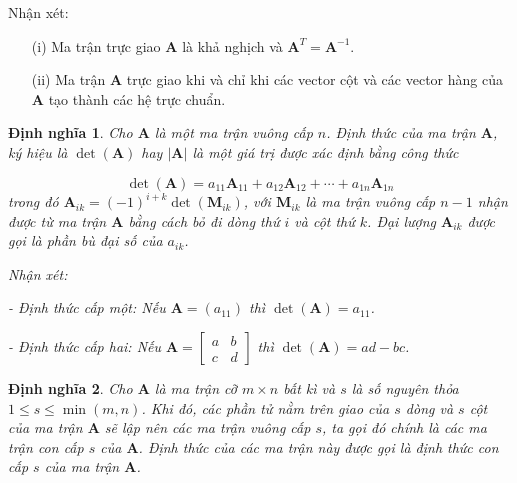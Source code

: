 \documentclass[12pt,a4paper,oneside]{report}
\newtheorem{dn}{Định nghĩa}[section]
\numberwithin{equation}{section}
\begin{document}
	Nhận xét:
	\begin{itemize}
	 
	
	\item[(i)] Ma trận trực giao $\mathbf{A}$ là khả nghịch và $\mathbf{A}^{T}=\mathbf{A}^{-1}$.
	
	\item[(ii)]  Ma trận $\mathbf{A}$ trực giao khi và chỉ khi các vector cột và các vector hàng của $\mathbf{A}$ tạo thành các hệ trực chuẩn.
	\end{itemize}
\begin{dn}\cite{hieu2019} 
	Cho $\mathbf{A}$ là một ma trận vuông cấp $n$. Định thức của ma trận $\mathbf{A}$, ký hiệu là $\operatorname{det}(\mathbf{A})$ hay $|\mathbf{A}|$ là một giá trị được xác định bằng công thức
	
	$$
	\operatorname{det}(\mathbf{A})=a_{11} \mathbf{A}_{11}+a_{12} \mathbf{A}_{12}+\cdots+a_{1 n} \mathbf{A}_{1 n}
	$$
	trong đó $\mathbf{A}_{i k}=(-1)^{i+k} \operatorname{det}\left(\mathbf{M}_{i k}\right)$, với $\mathbf{M}_{i k}$ là ma trận vuông cấp $n-1$ nhận được từ ma trận $\mathbf{A}$ bằng cách bỏ đi dòng thứ $i$ và cột thứ $k$. Đại lượng $\mathbf{A}_{i k}$ được gọi là phần bù đại số của $a_{i k}$.
	
	Nhận xét:
	
	- Định thức cấp một: Nếu $\mathbf{A}=\left(a_{11}\right)$ thì $\operatorname{det}(\mathbf{A})=a_{11}$.
	
	- Định thức cấp hai: Nếu $\mathbf{A}=\left[\begin{array}{ll}a & b \\ c & d\end{array}\right]$ thì $\operatorname{det}(\mathbf{A})=a d-b c$.
\end{dn}
\begin{dn}\cite{thuan2003}
	Cho $\mathbf{A}$ là ma trận cỡ $m \times n$ bất kì và $s$ là số nguyên thỏa $1 \leqslant s \leqslant \min (m, n)$. Khi đó, các phần tử nằm trên giao của $s$ dòng và $s$ cột của ma trận $\mathbf{A}$ sẽ lập nên các ma trận vuông cấp $s$, ta gọi đó chính là các ma trận con cấp $s$ của $\mathbf{A}$.
	Định thức của các ma trận này được gọi là định thức con cấp $s$ của ma trận $\mathbf{A}$.
\end{dn}
\end{document}
